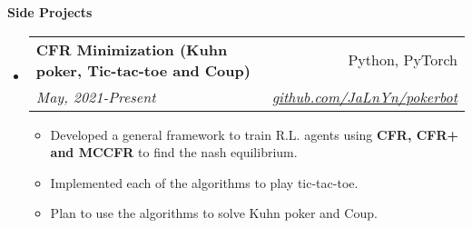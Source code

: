 \documentclass[letterpaper,12pt]{article}[leftmargin=*]
\makeatletter
\def \entryspacing {-0pt}
\renewcommand{\section}[2]{\vspace{6pt}
  \colorbox{secondary}{\color{white}\raggedbottom\normalsize\textbf{{#1}{\hspace{7pt}#2}}}
}
\newcommand{\resumeEntryStart}{\begin{itemize}[leftmargin=2.5mm]}
\newcommand{\resumeEntryEnd}{\end{itemize}\vspace{\entryspacing}}
\newcommand{\resumeItemListStart}{\begin{itemize}[leftmargin=4.5mm]}
\newcommand{\resumeItemListEnd}{\end{itemize}}
\newcommand{\resumeItem}[1]{
  \item\small{
    {#1 \vspace{-3pt}}
  }
}
\newcommand{\resumeEntryTSDL}[4]{
  \vspace{-1pt}\item[]
    \begin{tabularx}{0.97\textwidth}{X@{\hspace{60pt}}r}
      \textbf{\color{primary}#1} & {\firabook\color{accent}\small#2} \\
      \textit{\color{accent}\small#3} & \textit{\color{accent}\small#4} \\
    \end{tabularx}\vspace{-6pt}
}
\makeatother
\begin{document}
\section{\faFlask}{Side Projects}
  
  \resumeEntryStart
    \resumeEntryTSDL
      {CFR Minimization (Kuhn poker, Tic-tac-toe and Coup)}{Python, PyTorch}{May, 2021-Present}{\href{https://github.com/JaLnYn/pokerbot}{github.com/JaLnYn/pokerbot}}
    \resumeItemListStart
      \resumeItem {Developed a general framework to train R.L. agents using  \textbf{CFR, CFR+ and MCCFR} to find the nash equilibrium.}
      \resumeItem {Implemented each of the algorithms to play tic-tac-toe.}
      \resumeItem {Plan to use the algorithms to solve Kuhn poker and Coup.}
    \resumeItemListEnd
  \resumeEntryEnd 

\end{document}
